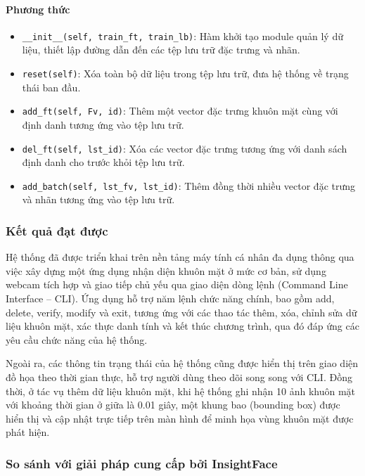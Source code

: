 \paragraph{Phương thức}
\begin{itemize}
    \item \texttt{\_\_init\_\_(self, train\_ft, train\_lb)}: Hàm khởi tạo module quản lý dữ liệu, thiết lập đường dẫn đến các tệp lưu trữ đặc trưng và nhãn.
    \item \texttt{reset(self)}: Xóa toàn bộ dữ liệu trong tệp lưu trữ, đưa hệ thống về trạng thái ban đầu.

    \item \texttt{add\_ft(self, Fv, id)}: Thêm một vector đặc trưng khuôn mặt cùng với định danh tương ứng vào tệp lưu trữ.
    
    \item \texttt{del\_ft(self, lst\_id)}: Xóa các vector đặc trưng tương ứng với danh sách định danh cho trước khỏi tệp lưu trữ.
    
    \item \texttt{add\_batch(self, lst\_fv, lst\_id)}: Thêm đồng thời nhiều vector đặc trưng và nhãn tương ứng vào tệp lưu trữ.
\end{itemize}
\subsubsection{Kết quả đạt được}
Hệ thống đã được triển khai trên nền tảng máy tính cá nhân đa dụng thông qua việc xây dựng một ứng dụng nhận diện khuôn mặt ở mức cơ bản, sử dụng webcam tích hợp và giao tiếp chủ yếu qua giao diện dòng lệnh (Command Line Interface – CLI). Ứng dụng hỗ trợ năm lệnh chức năng chính, bao gồm add, delete, verify, modify và exit, tương ứng với các thao tác thêm, xóa, chỉnh sửa dữ liệu khuôn mặt, xác thực danh tính và kết thúc chương trình, qua đó đáp ứng các yêu cầu chức năng của hệ thống.

Ngoài ra, các thông tin trạng thái của hệ thống cũng được hiển thị trên giao diện đồ họa theo thời gian thực, hỗ trợ người dùng theo dõi song song với CLI. Đồng thời, ở tác vụ thêm dữ liệu khuôn mặt, khi hệ thống ghi nhận 10 ảnh khuôn mặt với khoảng thời gian ở giữa là 0.01 giây, một khung bao (bounding box) được hiển thị và cập nhật trực tiếp trên màn hình để minh họa vùng khuôn mặt được phát hiện. 
\subsubsection{So sánh với giải pháp cung cấp bởi InsightFace}

